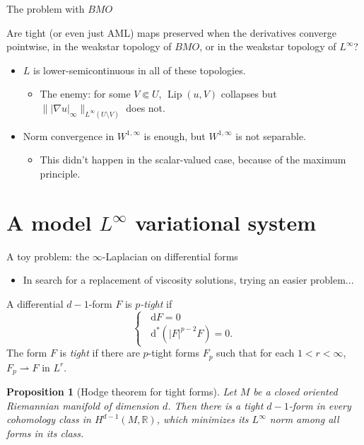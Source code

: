 \documentclass[10pt]{beamer}
\newcommand{\RR}{\mathbb{R}}
\newcommand*\dif{\mathop{}\!\mathrm{d}}
\DeclareMathOperator{\Lip}{Lip}
\newtheorem{proposition}{Proposition}
\begin{document}
\begin{frame}{The problem with $BMO$}
\begin{problem}
    Are tight (or even just AML) maps preserved when the derivatives converge pointwise, in the weakstar topology of $BMO$, or in the weakstar topology of $L^\infty$?  \pause
\end{problem}

\begin{itemize}
\item $L$ is lower-semicontinuous in all of these topologies. \pause
\begin{itemize}
\item The enemy: for some $V \Subset U$, $\Lip(u, V)$ collapses but $\||\nabla u|_\infty\|_{L^\infty(U \setminus V)}$ does not. \pause
\end{itemize}
\item Norm convergence in $W^{1, \infty}$ is enough, but $W^{1, \infty}$ is not separable. \pause 
\begin{itemize}
\item This didn't happen in the scalar-valued case, because of the maximum principle.
\end{itemize}
\end{itemize}
\end{frame}

\section{A model \texorpdfstring{$L^\infty$}{L-infinity} variational system}

\begin{frame}{A toy problem: the $\infty$-Laplacian on differential forms}
\begin{itemize}
\item In search for a replacement of viscosity solutions, trying an easier problem... \pause
\end{itemize}

\begin{definition}[B '24]
A differential $d - 1$-form $F$ is \emph{$p$-tight} if 
$$
\begin{cases}
    \dif F = 0 \\
    \dif^* (|F|^{p - 2} F) = 0.
\end{cases}$$
The form $F$ is \emph{tight} if there are $p$-tight forms $F_p$ such that for each $1 < r < \infty$, $F_p \rightharpoonup F$ in $L^r$. \pause
\end{definition}

\begin{proposition}[Hodge theorem for tight forms]
Let $M$ be a closed oriented Riemannian manifold of dimension $d$.
Then there is a tight $d - 1$-form in every cohomology class in $H^{d - 1}(M, \RR)$, which minimizes its $L^\infty$ norm among all forms in its class.
\end{proposition}
\end{frame}
\end{document}
